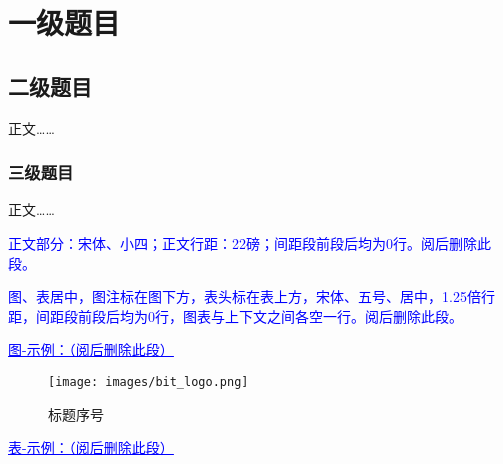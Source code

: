 %
%
%
%
%
%

\chapter{一级题目}

\section{二级题目}
正文……\cite{yuFeiJiZongTiDuoXueKeSheJiYouHuaDeXianZhuangYuFaZhanFangXiang2008}

\subsection{三级题目}

正文……\cite{Hajela2012Application}

\textcolor{blue}{正文部分：宋体、小四；正文行距：22磅；间距段前段后均为0行。阅后删除此段。}

\textcolor{blue}{图、表居中，图注标在图下方，表头标在表上方，宋体、五号、居中，1.25倍行距，间距段前段后均为0行，图表与上下文之间各空一行。阅后删除此段。}

\textcolor{blue}{\underline{\underline{图-示例：（阅后删除此段）}}}

\begin{figure}[htbp]
  \vspace{13pt} %
  \centering
  \texttt{[image: images/bit\_logo.png]}
  \caption{标题序号}\label{标题序号} %
\end{figure}

\textcolor{blue}{\underline{\underline{表-示例：（阅后删除此段）}}}


